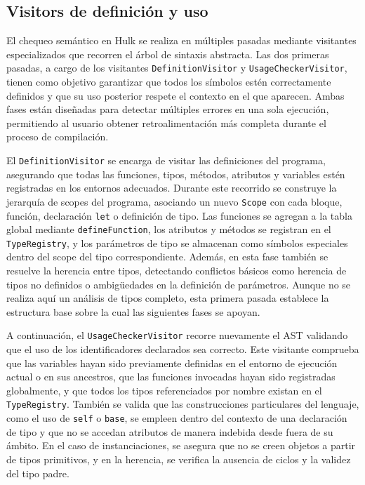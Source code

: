 \documentclass{llncs}
\begin{document}
	\subsection{Visitors de definición y uso}

	El chequeo semántico en Hulk se realiza en múltiples pasadas mediante visitantes especializados que recorren el árbol de sintaxis abstracta. Las dos primeras pasadas, a cargo de los visitantes \texttt{DefinitionVisitor} y \texttt{UsageCheckerVisitor}, tienen como objetivo garantizar que todos los símbolos estén correctamente definidos y que su uso posterior respete el contexto en el que aparecen. Ambas fases están diseñadas para detectar múltiples errores en una sola ejecución, permitiendo al usuario obtener retroalimentación más completa durante el proceso de compilación.

	El \texttt{DefinitionVisitor} se encarga de visitar las definiciones del programa, asegurando que todas las funciones, tipos, métodos, atributos y variables estén registradas en los entornos adecuados. Durante este recorrido se construye la jerarquía de scopes del programa, asociando un nuevo \texttt{Scope} con cada bloque, función, declaración \texttt{let} o definición de tipo. Las funciones se agregan a la tabla global mediante \texttt{defineFunction}, los atributos y métodos se registran en el \texttt{TypeRegistry}, y los parámetros de tipo se almacenan como símbolos especiales dentro del scope del tipo correspondiente. Además, en esta fase también se resuelve la herencia entre tipos, detectando conflictos básicos como herencia de tipos no definidos o ambigüedades en la definición de parámetros. Aunque no se realiza aquí un análisis de tipos completo, esta primera pasada establece la estructura base sobre la cual las siguientes fases se apoyan.

	A continuación, el \texttt{UsageCheckerVisitor} recorre nuevamente el AST validando que el uso de los identificadores declarados sea correcto. Este visitante comprueba que las variables hayan sido previamente definidas en el entorno de ejecución actual o en sus ancestros, que las funciones invocadas hayan sido registradas globalmente, y que todos los tipos referenciados por nombre existan en el \texttt{TypeRegistry}. También se valida que las construcciones particulares del lenguaje, como el uso de \texttt{self} o \texttt{base}, se empleen dentro del contexto de una declaración de tipo y que no se accedan atributos de manera indebida desde fuera de su ámbito. En el caso de instanciaciones, se asegura que no se creen objetos a partir de tipos primitivos, y en la herencia, se verifica la ausencia de ciclos y la validez del tipo padre.
\end{document}
